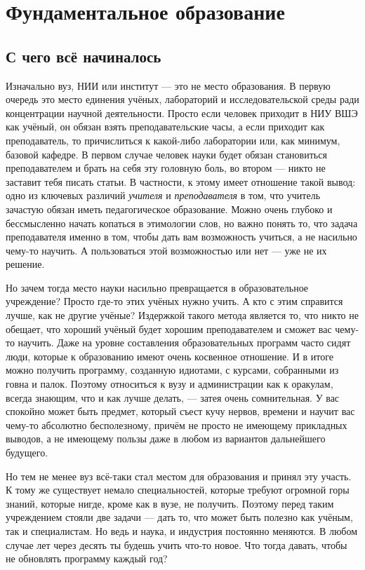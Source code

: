 \documentclass[12pt, a4paper]{article}
\begin{document}
\section{Фундаментальное образование}

\subsection{С чего всё начиналось}

Изначально вуз, НИИ или институт --- это не место образования. В первую очередь это место единения учёных, лабораторий и исследовательской среды ради концентрации научной деятельности. Просто если человек приходит в НИУ ВШЭ как учёный, он обязан взять преподавательские часы, а если приходит как преподаватель, то причислиться к какой-либо лаборатории или, как минимум, базовой кафедре. В первом случае человек науки будет обязан становиться преподавателем и брать на себя эту головную боль, во втором --- никто не заставит тебя писать статьи. В частности, к этому имеет отношение такой вывод: одно из ключевых различий \textit{учителя} и \textit{преподавателя} в том, что учитель зачастую обязан иметь педагогическое образование. Можно очень глубоко и бессмысленно начать копаться в этимологии слов, но важно понять то, что задача преподавателя именно в том, чтобы дать вам возможность учиться, а не насильно чему-то научить. А пользоваться этой возможностью или нет --- уже не их решение.

Но зачем тогда место науки насильно превращается в образовательное учреждение? Просто где-то этих учёных нужно учить. А кто с этим справится лучше, как не другие учёные? Издержкой такого метода является то, что никто не обещает, что хороший учёный будет хорошим преподавателем и сможет вас чему-то научить. Даже на уровне составления образовательных программ часто сидят люди, которые к образованию имеют очень косвенное отношение. И в итоге можно получить программу, созданную идиотами, с курсами, собранными из говна и палок. Поэтому относиться к вузу и администрации как к оракулам, всегда знающим, что и как лучше делать, --- затея очень сомнительная. У вас спокойно может быть предмет, который съест кучу нервов, времени и научит вас чему-то абсолютно бесполезному, причём не просто не имеющему прикладных выводов, а не имеющему пользы даже в любом из вариантов дальнейшего будущего.

Но тем не менее вуз всё-таки стал местом для образования и принял эту участь. К тому же существует немало специальностей, которые требуют огромной горы знаний, которые нигде, кроме как в вузе, не получить. Поэтому перед таким учреждением стояли две задачи --- дать то, что может быть полезно как учёным, так и специалистам. Но ведь и наука, и индустрия постоянно меняются. В любом случае лет через десять ты будешь учить что-то новое. Что тогда давать, чтобы не обновлять программу каждый год? 
\end{document}
